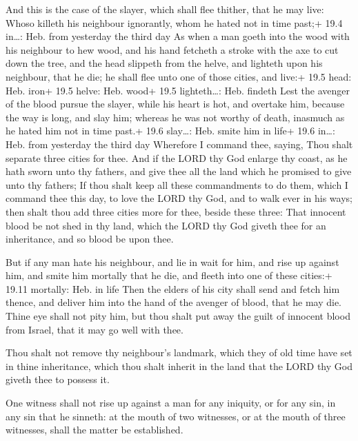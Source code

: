  And this is the case of the slayer, which shall flee
thither, that he may live: Whoso killeth his neighbour ignorantly, whom
he hated not in time past;+ 19.4 in\ldots: Heb. from yesterday the third
day  As when a man goeth into the wood with his neighbour to
hew wood, and his hand fetcheth a stroke with the axe to cut down the
tree, and the head slippeth from the helve, and lighteth upon his
neighbour, that he die; he shall flee unto one of those cities, and
live:+ 19.5 head: Heb. iron+ 19.5 helve: Heb. wood+ 19.5 lighteth\ldots:
Heb. findeth  Lest the avenger of the blood pursue the
slayer, while his heart is hot, and overtake him, because the way is
long, and slay him; whereas he was not worthy of death, inasmuch as he
hated him not in time past.+ 19.6 slay\ldots: Heb. smite him in life+
19.6 in\ldots: Heb. from yesterday the third day  Wherefore
I command thee, saying, Thou shalt separate three cities for thee.
 And if the LORD thy God enlarge thy coast, as he hath sworn
unto thy fathers, and give thee all the land which he promised to give
unto thy fathers;  If thou shalt keep all these commandments
to do them, which I command thee this day, to love the LORD thy God, and
to walk ever in his ways; then shalt thou add three cities more for
thee, beside these three:  That innocent blood be not shed
in thy land, which the LORD thy God giveth thee for an inheritance, and
so blood be upon thee.

 But if any man hate his neighbour, and lie in wait for
him, and rise up against him, and smite him mortally that he die, and
fleeth into one of these cities:+ 19.11 mortally: Heb. in life
 Then the elders of his city shall send and fetch him
thence, and deliver him into the hand of the avenger of blood, that he
may die.  Thine eye shall not pity him, but thou shalt put
away the guilt of innocent blood from Israel, that it may go well with
thee.

 Thou shalt not remove thy neighbour's landmark, which
they of old time have set in thine inheritance, which thou shalt inherit
in the land that the LORD thy God giveth thee to possess it.

 One witness shall not rise up against a man for any
iniquity, or for any sin, in any sin that he sinneth: at the mouth of
two witnesses, or at the mouth of three witnesses, shall the matter be
established.

